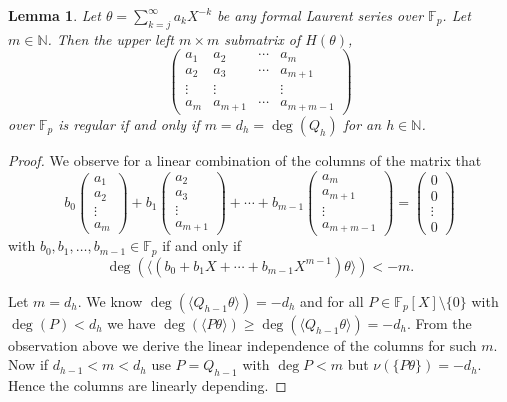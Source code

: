 \documentclass{article}
\newcommand{\NN}{\mathbb N}
\newcommand{\FF}{\mathbb{F}}
\renewcommand{\(}{\left (}
\renewcommand{\)}{\right )}
\newtheorem{lemma}[theorem]{Lemma}
\theoremstyle{definition}
\numberwithin{equation}{section}
\begin{document}
\begin{lemma}\label{prop:1}
	Let $\theta=\sum_{k=j}^\infty a_kX^{-k}$ be any formal Laurent series over $\FF_p$. Let $m\in\NN$. Then
	the upper left $m\times m$ submatrix of $H(\theta)$, 
	$$\begin{pmatrix}
		a_1&a_2&\cdots&a_m\\
		a_2&a_3&\cdots&a_{m+1}\\
		\vdots&\vdots&&\vdots\\
		a_{m}&a_{m+1}&\cdots&a_{m+m-1} 
	\end{pmatrix} $$
	over $\FF_p$ is regular if and only if $m=d_h=\deg(Q_h)$ for an $h\in\NN$. 
\end{lemma}
\begin{proof}
	We observe for a linear combination of the columns of the matrix that 
	$$b_0\begin{pmatrix}
		a_1\\
		a_2\\
		\vdots\\
		a_{m}
	\end{pmatrix} +b_1\begin{pmatrix}
		a_2\\
		a_3\\
		\vdots\\
		a_{m+1}
	\end{pmatrix}+\cdots + b_{m-1}\begin{pmatrix}
		a_m\\
		a_{m+1}\\
		\vdots\\
		a_{m+m-1}
	\end{pmatrix} =\begin{pmatrix}
		0\\
		0\\
		\vdots\\
		0
	\end{pmatrix}$$
	with $b_0,b_1,\ldots,b_{m-1}\in\FF_p$ if and only if 
	$$\deg(\langle(b_0+b_1X+\cdots+b_{m-1}X^{m-1})\theta\rangle)< -m.$$
	
	Let $m=d_h$. We know $\deg(\langle Q_{h-1}\theta\rangle)=-d_{h}$ and for all $P\in\FF_p[X]\setminus\{0\}$ with $\deg(P)<d_{h}$ we have $\deg(\langle P\theta\rangle)\geq \deg(\langle Q_{h-1}\theta\rangle)=-d_{h}$. From the observation above we derive the linear independence of the columns for such $m$. %
	Now if $d_{h-1}<m<d_h$ use $P=Q_{h-1}$ with $\deg P<m$ but $\nu(\{P\theta\})=-d_h$. Hence the columns are linearly depending. %
\end{proof}
\end{document}
